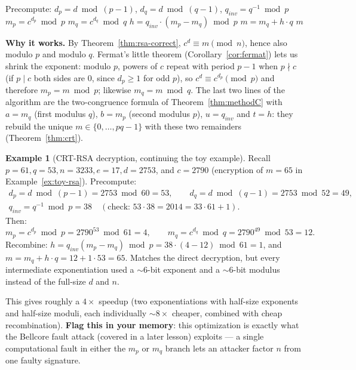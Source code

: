 \documentclass[11pt]{article}
\theoremstyle{definition}
\newtheorem{example}[theorem]{Example}
\theoremstyle{remark}
\begin{document}
\begin{algorithm}[h]
\caption{CRT-RSA Decryption}\label{alg:crt-rsa}
\begin{algorithmic}[1]
\State Precompute: $d_p = d \bmod (p-1)$, \quad $d_q = d \bmod (q-1)$, \quad $q_{inv} = q^{-1} \bmod p$
\State $m_p = c^{d_p} \bmod p$
\State $m_q = c^{d_q} \bmod q$
\State $h = q_{inv} \cdot (m_p - m_q) \bmod p$
\State $m = m_q + h \cdot q$
\State \Return $m$
\end{algorithmic}
\end{algorithm}


\textbf{Why it works.} By Theorem~\ref{thm:rsa-correct}, $c^{d}\equiv m\pmod n$, hence also modulo $p$ and modulo $q$. Fermat's little theorem (Corollary~\ref{cor:fermat}) lets us shrink the exponent: modulo $p$, powers of $c$ repeat with period $p-1$ when $p\nmid c$ (if $p\mid c$ both sides are $0$, since $d_p\ge1$ for odd $p$), so $c^{d}\equiv c^{d_p}\pmod p$ and therefore $m_p=m\bmod p$; likewise $m_q=m\bmod q$. The last two lines of the algorithm are the two-congruence formula of Theorem~\ref{thm:methodC} with $a=m_q$ (first modulus $q$), $b=m_p$ (second modulus $p$), $u=q_{inv}$ and $t=h$: they rebuild the unique $m\in\{0,\dots,pq-1\}$ with these two remainders (Theorem~\ref{thm:crt}).


\begin{example}[CRT-RSA decryption, continuing the toy example]
Recall $p=61, q=53, n=3233, e=17, d=2753$, and $c = 2790$ (encryption of $m=65$ in Example~\ref{ex:toy-rsa}). Precompute:
\begin{gather*}
d_p = d \bmod (p-1) = 2753 \bmod 60 = 53, \qquad d_q = d \bmod (q-1) = 2753 \bmod 52 = 49,\\
q_{inv} = q^{-1} \bmod p = 38 \quad (\text{check: } 53\cdot38=2014=33\cdot61+1).
\end{gather*}
Then:
\[
m_p = c^{d_p} \bmod p = 2790^{53} \bmod 61 = 4, \qquad m_q = c^{d_q} \bmod q = 2790^{49} \bmod 53 = 12.
\]
Recombine: $h = q_{inv}(m_p - m_q) \bmod p = 38 \cdot (4-12) \bmod 61 = 1$, and $m = m_q + h \cdot q = 12 + 1 \cdot 53 = 65$. \checkmark Matches the direct decryption, but every intermediate exponentiation used a $\sim$6-bit exponent and a $\sim$6-bit modulus instead of the full-size $d$ and $n$.
\end{example}



This gives roughly a $4\times$ speedup (two exponentiations with half-size exponents and half-size moduli, each individually $\sim 8\times$ cheaper, combined with cheap recombination). \textbf{Flag this in your memory}: this optimization is exactly what the Bellcore fault attack (covered in a later lesson) exploits — a single computational fault in either the $m_p$ or $m_q$ branch lets an attacker factor $n$ from one faulty signature.
\end{document}
